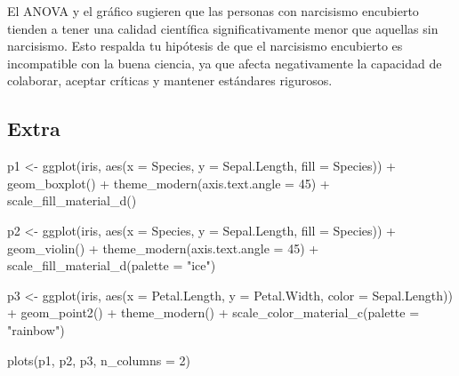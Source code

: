 \documentclass[
  10pt]{article}
\newenvironment{Shaded}{\begin{snugshade}}{\end{snugshade}}
\newcommand{\AttributeTok}[1]{\textcolor[rgb]{0.40,0.45,0.13}{#1}}
\newcommand{\DecValTok}[1]{\textcolor[rgb]{0.68,0.00,0.00}{#1}}
\newcommand{\FunctionTok}[1]{\textcolor[rgb]{0.28,0.35,0.67}{#1}}
\newcommand{\NormalTok}[1]{\textcolor[rgb]{0.00,0.23,0.31}{#1}}
\newcommand{\OtherTok}[1]{\textcolor[rgb]{0.00,0.23,0.31}{#1}}
\newcommand{\SpecialCharTok}[1]{\textcolor[rgb]{0.37,0.37,0.37}{#1}}
\newcommand{\StringTok}[1]{\textcolor[rgb]{0.13,0.47,0.30}{#1}}
\begin{document}
El ANOVA y el gráfico sugieren que las personas con narcisismo
encubierto tienden a tener una calidad científica significativamente
menor que aquellas sin narcisismo. Esto respalda tu hipótesis de que el
narcisismo encubierto es incompatible con la buena ciencia, ya que
afecta negativamente la capacidad de colaborar, aceptar críticas y
mantener estándares rigurosos.

\subsection{Extra}\label{extra}

\begin{Shaded}
\begin{Highlighting}[]
\NormalTok{p1 }\OtherTok{\textless{}{-}} \FunctionTok{ggplot}\NormalTok{(iris, }\FunctionTok{aes}\NormalTok{(}\AttributeTok{x =}\NormalTok{ Species, }\AttributeTok{y =}\NormalTok{ Sepal.Length, }\AttributeTok{fill =}\NormalTok{ Species)) }\SpecialCharTok{+}
  \FunctionTok{geom\_boxplot}\NormalTok{() }\SpecialCharTok{+}
  \FunctionTok{theme\_modern}\NormalTok{(}\AttributeTok{axis.text.angle =} \DecValTok{45}\NormalTok{) }\SpecialCharTok{+}
  \FunctionTok{scale\_fill\_material\_d}\NormalTok{()}

\NormalTok{p2 }\OtherTok{\textless{}{-}} \FunctionTok{ggplot}\NormalTok{(iris, }\FunctionTok{aes}\NormalTok{(}\AttributeTok{x =}\NormalTok{ Species, }\AttributeTok{y =}\NormalTok{ Sepal.Length, }\AttributeTok{fill =}\NormalTok{ Species)) }\SpecialCharTok{+}
  \FunctionTok{geom\_violin}\NormalTok{() }\SpecialCharTok{+}
  \FunctionTok{theme\_modern}\NormalTok{(}\AttributeTok{axis.text.angle =} \DecValTok{45}\NormalTok{) }\SpecialCharTok{+}
  \FunctionTok{scale\_fill\_material\_d}\NormalTok{(}\AttributeTok{palette =} \StringTok{"ice"}\NormalTok{)}

\NormalTok{p3 }\OtherTok{\textless{}{-}} \FunctionTok{ggplot}\NormalTok{(iris, }\FunctionTok{aes}\NormalTok{(}\AttributeTok{x =}\NormalTok{ Petal.Length, }\AttributeTok{y =}\NormalTok{ Petal.Width, }\AttributeTok{color =}\NormalTok{ Sepal.Length)) }\SpecialCharTok{+}
  \FunctionTok{geom\_point2}\NormalTok{() }\SpecialCharTok{+}
  \FunctionTok{theme\_modern}\NormalTok{() }\SpecialCharTok{+}
  \FunctionTok{scale\_color\_material\_c}\NormalTok{(}\AttributeTok{palette =} \StringTok{"rainbow"}\NormalTok{)}

\FunctionTok{plots}\NormalTok{(p1, p2, p3, }\AttributeTok{n\_columns =} \DecValTok{2}\NormalTok{)}
\end{Highlighting}
\end{Shaded}
\end{document}
